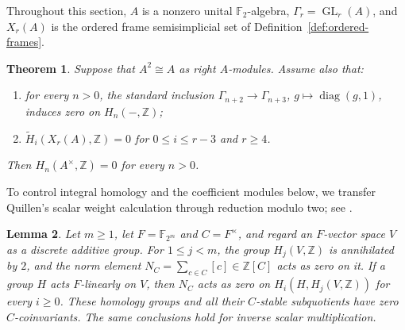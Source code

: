 \documentclass[11pt]{amsart}
\newcommand{\Z}{\mathbb Z}
\newcommand{\F}{\mathbb F}
\DeclareMathOperator{\GL}{GL}
\newtheorem{theorem}{Theorem}[section]
\newtheorem{lemma}[theorem]{Lemma}
\theoremstyle{definition}
\theoremstyle{remark}
\numberwithin{equation}{section}
\begin{document}
Throughout this section, $A$ is a nonzero unital $\F_2$-algebra, $\Gamma_r=\GL_r(A)$, and $X_r(A)$ is the ordered frame semisimplicial set of Definition~\ref{def:ordered-frames}.

\begin{theorem}\label{thm:acyclicity-criterion}
Suppose that $A^2\cong A$ as right $A$-modules. Assume also that:
\begin{enumerate}
\item for every $n>0$, the standard inclusion $\Gamma_{n+2}\to\Gamma_{n+3}$, $g\mapsto\operatorname{diag}(g,1)$, induces zero on $H_n(-,\Z)$;
\item $\widetilde H_i(X_r(A),\Z)=0$ for $0\leq i\leq r-3$ and $r\geq4$.
\end{enumerate}
Then $H_n(A^\times,\Z)=0$ for every $n>0$.
\end{theorem}

To control integral homology and the coefficient modules below, we transfer Quillen's scalar weight calculation through reduction modulo two; see \cite[\S11, Lemmas~15--16]{Quillen72}.

\begin{lemma}\label{lem:scalar-homology}
Let $m\geq1$, let $F=\F_{2^m}$ and $C=F^\times$, and regard an $F$-vector space $V$ as a discrete additive group. For $1\leq j<m$, the group $H_j(V,\Z)$ is annihilated by $2$, and the norm element $N_C=\sum_{c\in C}[c]\in\Z[C]$ acts as zero on it. If a group $H$ acts $F$-linearly on $V$, then $N_C$ acts as zero on $H_i(H,H_j(V,\Z))$ for every $i\geq0$. These homology groups and all their $C$-stable subquotients have zero $C$-coinvariants. The same conclusions hold for inverse scalar multiplication.
\end{lemma}
\end{document}
